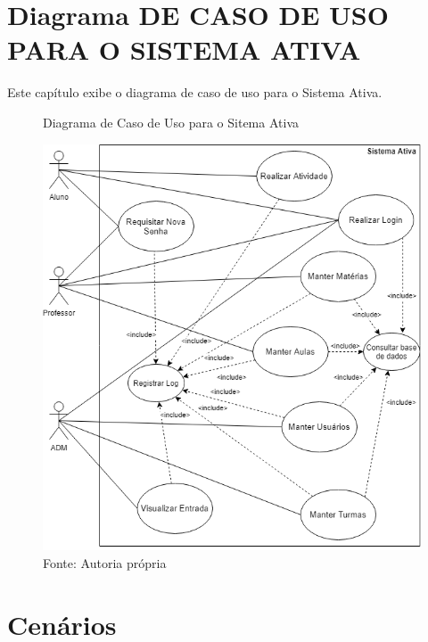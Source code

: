 \documentclass{utfpr-pg}
\begin{document}
\chapter{Diagrama DE CASO DE USO PARA O SISTEMA ATIVA}
  \label{chapter:diagrama de cado de uso para o sistema ativa}
  Este capítulo exibe o diagrama de caso de uso para o Sistema Ativa.
    \begin{figure}[H]
            \centering
            \captionsetup{width=0.9\textwidth}
            \caption{Diagrama de Caso de Uso para o Sitema Ativa}
            \includegraphics[width=\linewidth]{fotos/Diagrama de caso de uso.png}
            \caption*{Fonte: Autoria própria}
            \label{fig:Diagrama de Caso de Uso}
        \end{figure}
 
 
\chapter{Cenários}
    \label{chapter:cenario}
\end{document}
